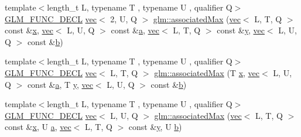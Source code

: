 \begin{DoxyCompactItemize}
\item 
{\footnotesize template$<$length\+\_\+t L, typename T , typename U , qualifier Q$>$ }\\\hyperlink{setup_8hpp_ab2d052de21a70539923e9bcbf6e83a51}{G\+L\+M\+\_\+\+F\+U\+N\+C\+\_\+\+D\+E\+CL} \hyperlink{structglm_1_1vec}{vec}$<$ 2, U, Q $>$ \hyperlink{group__gtx__associated__min__max_ga5c6758bc50aa7fbe700f87123a045aad}{glm\+::associated\+Max} (\hyperlink{structglm_1_1vec}{vec}$<$ L, T, Q $>$ const \&\hyperlink{_s_d_l__opengl_8h_ad0e63d0edcdbd3d79554076bf309fd47}{x}, \hyperlink{structglm_1_1vec}{vec}$<$ L, U, Q $>$ const \&\hyperlink{_s_d_l__opengl__glext_8h_a3309789fc188587d666cda5ece79cf82}{a}, \hyperlink{structglm_1_1vec}{vec}$<$ L, T, Q $>$ const \&\hyperlink{_s_d_l__opengl_8h_a1675d9d7bb68e1657ff028643b4037e3}{y}, \hyperlink{structglm_1_1vec}{vec}$<$ L, U, Q $>$ const \&\hyperlink{_s_d_l__opengl__glext_8h_a0f71581a41fd2264c8944126dabbd010}{b})
\item 
{\footnotesize template$<$length\+\_\+t L, typename T , typename U , qualifier Q$>$ }\\\hyperlink{setup_8hpp_ab2d052de21a70539923e9bcbf6e83a51}{G\+L\+M\+\_\+\+F\+U\+N\+C\+\_\+\+D\+E\+CL} \hyperlink{structglm_1_1vec}{vec}$<$ L, T, Q $>$ \hyperlink{group__gtx__associated__min__max_ga0d169d6ce26b03248df175f39005d77f}{glm\+::associated\+Max} (T \hyperlink{_s_d_l__opengl_8h_ad0e63d0edcdbd3d79554076bf309fd47}{x}, \hyperlink{structglm_1_1vec}{vec}$<$ L, U, Q $>$ const \&\hyperlink{_s_d_l__opengl__glext_8h_a3309789fc188587d666cda5ece79cf82}{a}, T \hyperlink{_s_d_l__opengl_8h_a1675d9d7bb68e1657ff028643b4037e3}{y}, \hyperlink{structglm_1_1vec}{vec}$<$ L, U, Q $>$ const \&\hyperlink{_s_d_l__opengl__glext_8h_a0f71581a41fd2264c8944126dabbd010}{b})
\item 
{\footnotesize template$<$length\+\_\+t L, typename T , typename U , qualifier Q$>$ }\\\hyperlink{setup_8hpp_ab2d052de21a70539923e9bcbf6e83a51}{G\+L\+M\+\_\+\+F\+U\+N\+C\+\_\+\+D\+E\+CL} \hyperlink{structglm_1_1vec}{vec}$<$ L, U, Q $>$ \hyperlink{group__gtx__associated__min__max_ga4086269afabcb81dd7ded33cb3448653}{glm\+::associated\+Max} (\hyperlink{structglm_1_1vec}{vec}$<$ L, T, Q $>$ const \&\hyperlink{_s_d_l__opengl_8h_ad0e63d0edcdbd3d79554076bf309fd47}{x}, U \hyperlink{_s_d_l__opengl__glext_8h_a3309789fc188587d666cda5ece79cf82}{a}, \hyperlink{structglm_1_1vec}{vec}$<$ L, T, Q $>$ const \&\hyperlink{_s_d_l__opengl_8h_a1675d9d7bb68e1657ff028643b4037e3}{y}, U \hyperlink{_s_d_l__opengl__glext_8h_a0f71581a41fd2264c8944126dabbd010}{b})

\end{DoxyCompactItemize}
